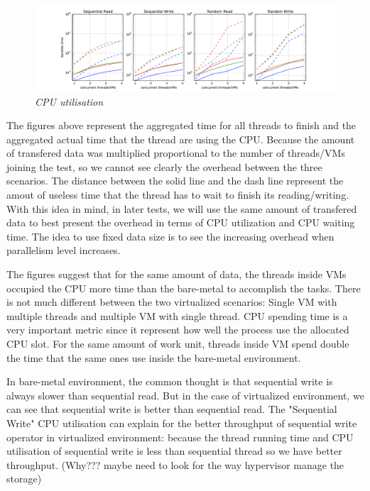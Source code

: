 \documentclass{acmsig}
\begin{document}
\begin{figure}[t]
  \includegraphics[scale=0.5]{CPUutilisation}
  \caption{\textit{CPU utilisation}}
  \label{fig:CPUutilisation}
\end{figure}

The figures above represent the aggregated time for all threads to finish and the aggregated actual time that the thread are using the CPU. Because the amount of transfered data was multiplied proportional to the number of threads/VMs joining the test, so we cannot see clearly the overhead between the three scenarios. The distance between the solid line and the dash line represent the amout of useless time that the thread has to wait to finish its reading/writing. With this idea in mind, in later tests, we will use the same amount of transfered data to best present the overhead in terms of CPU utilization and CPU waiting time. The idea to use fixed data size is to see the increasing overhead when parallelism level increases.

The figures suggest that for the same amount of data, the threads inside VMs occupied the CPU more time than the bare-metal to accomplish the tasks. There is not much different between the two virtualized scenarios: Single VM with multiple threads and multiple VM with single thread. CPU spending time is a very important metric since it represent how well the process use the allocated CPU slot. For the same amount of work unit, threads inside VM spend double the time that the same ones use inside the bare-metal environment.

In bare-metal environment, the common thought is that sequential write is always slower than sequential read. But in the case of virtualized environment, we can see that sequential write is better than sequential read. The "Sequential Write" CPU utilisation can explain for the better throughput of sequential write operator in virtualized environment: because the thread running time and CPU utilisation of sequential write is less than sequential thread so we have better throughput. (Why??? maybe need to look for the way hypervisor manage the storage)
\end{document}

